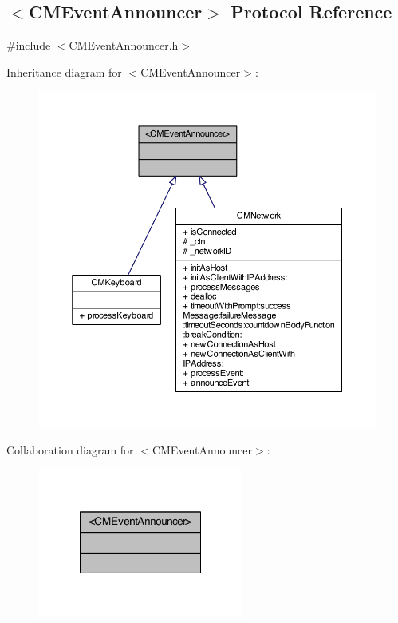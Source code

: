 \subsection{$<$C\-M\-Event\-Announcer$>$ Protocol Reference}
\label{protocol_c_m_event_announcer-p}


{\ttfamily \#include $<$C\-M\-Event\-Announcer.\-h$>$}



Inheritance diagram for $<$C\-M\-Event\-Announcer$>$\-:
\nopagebreak
\begin{figure}[H]
\begin{center}
\leavevmode
\includegraphics[width=350pt]{protocol_c_m_event_announcer-p__inherit__graph}
\end{center}
\end{figure}


Collaboration diagram for $<$C\-M\-Event\-Announcer$>$\-:
\nopagebreak
\begin{figure}[H]
\begin{center}
\leavevmode
\includegraphics[width=192pt]{protocol_c_m_event_announcer-p__coll__graph}
\end{center}
\end{figure}


